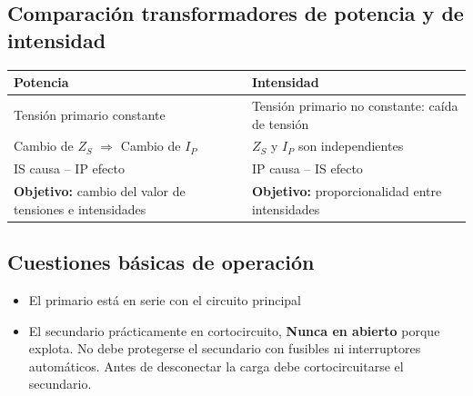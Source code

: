 \subsection{Comparación transformadores de potencia y de intensidad}
\begin{table}[H]
	\centering
	\begin{tabular}{|p{5cm}|p{5cm}|}
		\hline
		\textbf{Potencia} & \textbf{Intensidad} \\ \hline
		Tensión primario constante & Tensión primario no constante: caída de tensión\\ \hline
		  Cambio de $Z_S$ $\Rightarrow$ Cambio de $I_P$ & $Z_S$ y $I_P$ son independientes\\ \hline
		  IS causa – IP efecto& IP causa – IS efecto\\ \hline
		\textbf{Objetivo:} cambio del valor de tensiones e intensidades & \textbf{Objetivo:} proporcionalidad entre intensidades \\ \hline
	\end{tabular}
	\label{tab:potencia_intensidad}
\end{table}
\subsection{Cuestiones básicas de operación}
\begin{itemize}
	\item El primario está en serie con el circuito principal
	\item El secundario prácticamente en cortocircuito, \textbf{Nunca en abierto} porque explota. No debe protegerse el secundario con fusibles ni interruptores automáticos. Antes de desconectar la carga debe cortocircuitarse el secundario. 
\end{itemize}
